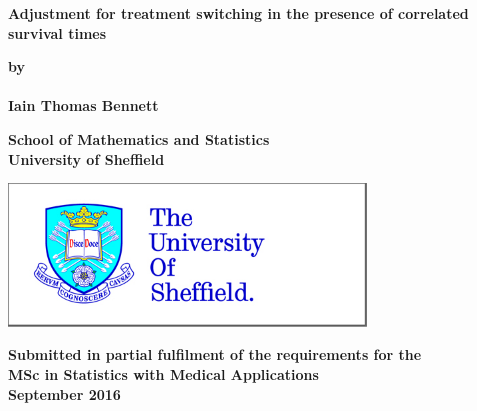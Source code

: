 \thispagestyle{empty}
\null\vskip0.2in%
\begin{center}
	\LARGE{\textbf{Adjustment for treatment switching in the presence of correlated survival times}}
\end{center}

\vspace{0.5cm}

\begin{center}
	{\Large \textbf{by}}\\
	\mbox{} \\
	{\Large\textbf{Iain Thomas Bennett}}
\end{center}

\vspace{1cm}

\begin{center}
	\large{\bf{School of Mathematics and Statistics\\ University of Sheffield}}
\end{center}


\vspace{1.5cm}

\begin{center}
	\includegraphics[width=9.5cm,keepaspectratio]{tuoslogo_key_cmyk_med.jpg} %
\end{center}

\vspace{1.5cm}

\begin{center}
	\large{\bf{Submitted in partial fulfilment of the requirements for the \\
    MSc in Statistics with Medical Applications\\
    September 2016}}
\end{center}

\vspace{2cm}

